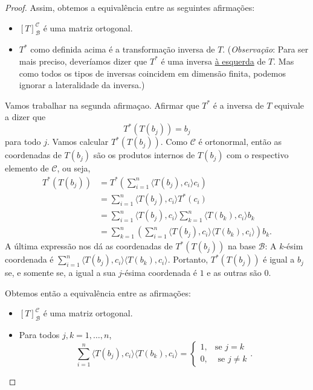 \begin{proof}
	Assim, obtemos a equivalência entre as seguintes afirmações:
	\begin{itemize}
		\item $[T]_{\mathcal{B}}^{\mathcal{C}}$ é uma matriz ortogonal.
		\item $T^*$ como definida acima é a transformação inversa de $T$. (\textit{Observação}: Para ser mais preciso, deveríamos dizer que $T^*$ é uma inversa \uline{à esquerda} de $T$. Mas como todos os tipos de inversas coincidem em dimensão finita, podemos ignorar a lateralidade da inversa.)
	\end{itemize}
	Vamos trabalhar na segunda afirmaçao. Afirmar que $T^*$ é a inversa de $T$ equivale a dizer que
	\[T^*(T(b_j))=b_j\]
	para todo $j$. Vamos calcular $T^*(T(b_j))$. Como $\mathcal{C}$ é ortonormal, então as coordenadas de $T(b_j)$ são os produtos internos de $T(b_j)$ com o respectivo elemento de $\mathcal{C}$, ou seja, 
	\begin{align*}
	T^*(T(b_j))
		&=T^*\left(\sum_{i=1}^n\langle T(b_j),c_i\rangle c_i\right)\\
		&=\sum_{i=1}^n\langle T(b_j),c_i\rangle T^*(c_i)\\
		&=\sum_{i=1}^n\langle T(b_j),c_i\rangle\sum_{k=1}^n\langle T(b_k),c_i\rangle b_k\\
		&=\sum_{k=1}^n\left(\sum_{i=1}^n\langle T(b_j),c_i\rangle\langle T(b_k),c_i\rangle\right)b_k.
	\end{align*}
	A última expressão nos dá as coordenadas de $T^*(T(b_j))$ na base $\mathcal{B}$: A $k$-ésim coordenada é $\sum_{i=1}^n\langle T(b_j),c_i\rangle\langle T(b_k),c_i\rangle$. Portanto, $T^*(T(b_j))$ é igual a $b_j$ se, e somente se, a igual a sua $j$-ésima coordenada é $1$ e as outras são $0$.
	
	Obtemos então a equivalência entre as afirmações:
	\begin{itemize}
		\item $[T]_{\mathcal{B}}^{\mathcal{C}}$ é uma matriz ortogonal.
		\item Para todos $j,k=1,\ldots, n$,
		\[\sum_{i=1}^n\langle T(b_j),c_i\rangle\langle T(b_k),c_i\rangle=\begin{cases}1,&\text{se }j=k\\
		0,&\text{ se }j\neq k\end{cases}.\]
	\end{itemize}
	

\end{proof}
